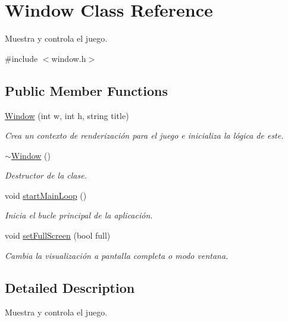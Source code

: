 \hypertarget{class_window}{\section{Window Class Reference}
\label{class_window}
}


Muestra y controla el juego.  




{\ttfamily \#include $<$window.\-h$>$}

\subsection*{Public Member Functions}
\begin{DoxyCompactItemize}
\item 
\hyperlink{class_window_a110bc154af59208fbf5cb0129d05969a}{Window} (int w, int h, string title)
\begin{DoxyCompactList}\small\item\em Crea un contexto de renderización para el juego e inicializa la lógica de este. \end{DoxyCompactList}\item 
\hyperlink{class_window_a245d821e6016fa1f6970ccbbedd635f6}{$\sim$\-Window} ()
\begin{DoxyCompactList}\small\item\em Destructor de la clase. \end{DoxyCompactList}\item 
void \hyperlink{class_window_a727b4389e46a6403a128a1e4604f45cd}{start\-Main\-Loop} ()
\begin{DoxyCompactList}\small\item\em Inicia el bucle principal de la aplicación. \end{DoxyCompactList}\item 
void \hyperlink{class_window_ab4195686ce0df358d615c9f6a7577b33}{set\-Full\-Screen} (bool full)
\begin{DoxyCompactList}\small\item\em Cambia la visualización a pantalla completa o modo ventana. \end{DoxyCompactList}\end{DoxyCompactItemize}


\subsection{Detailed Description}
Muestra y controla el juego. 

